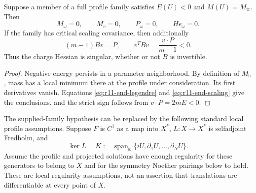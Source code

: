 \begin{theorem}
\label{thm:r11-end-attained}
Suppose a member of a full profile family satisfies
$E(U)<0$ and $M(U)=M_{\mathrm{tr}}$.  Then
\begin{equation}\label{eq:r11-end-attained}
 M_\omega=0,\qquad M_v=0,\qquad P_\omega=0,
 \qquad He_\omega=0.
\end{equation}
If the family has critical scaling covariance, then additionally
\begin{equation}\label{eq:r11-end-response}
 (m-1)Bv=P,\qquad v^TBv=\frac{v\cdot P}{m-1}<0.
\end{equation}
Thus the charge Hessian is singular, whether or not $B$ is invertible.
\end{theorem}
\begin{proof}
Negative energy persists in a parameter neighborhood.  By definition of
$M_{\mathrm{tr}}$, mass has a local minimum there at the profile under
consideration.  Its first derivatives vanish.  Equations
\eqref{eq:r11-end-legendre} and \eqref{eq:r11-end-scaling} give the
conclusions, and the strict sign follows from $v\cdot P=2mE<0$.
\end{proof}

The supplied-family hypothesis can be replaced by the following standard
local profile assumptions.  Suppose $F$ is $C^1$ as a map into $X^*$,
$L:X\to X^*$ is selfadjoint Fredholm, and
\begin{equation}\label{eq:r11-end-kernel}
 \ker L=K:=\operatorname{span}_{\mathbb R}
             \{iU,\partial_1U,\ldots,\partial_NU\}.
\end{equation}
Assume the profile and projected solutions have enough regularity for
these generators to belong to $X$ and for the symmetry Noether pairings
below to hold.  These are local regularity assumptions, not an assertion
that translations are differentiable at every point of $X$.


